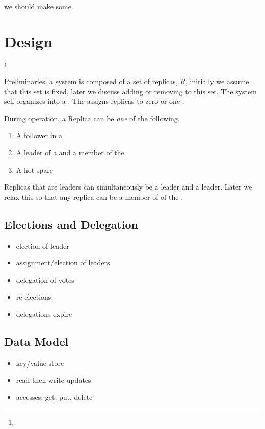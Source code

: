 \documentclass[10pt,twocolumn]{article}
\begin{document}
 we should make some.

\section*{Design}\footnote{}

Preliminaries: a system is composed of a set of replicas, $R$, initially we
assume that this set is fixed, later we discuss adding or removing to this
set.
The system self organizes into a \roo.
The \roo assigns replicas to zero or one \subs.

During operation, a Replica can be \emph{one} of the following.

\begin{enumerate}
    \item A follower in a \sub
    \item A leader of a \sub and a member of the \roo
    \item A hot spare
\end{enumerate}

Replicas that are leaders can simultaneously be a \sub leader and a \roo
leader.
Later we relax this so that any replica can be a member of of the \roo.

\subsection*{Elections and Delegation}

\begin{itemize}
    \item election of \roo leader
    \item assignment/election of \sub leaders
    \item delegation of votes
    \item re-elections
    \item delegations expire
\end{itemize}

\subsection*{Data Model}


\begin{itemize}
    \item key/value store
    \item read then write updates 
    \item accesses: get, put, delete
\end{itemize}
\end{document}
